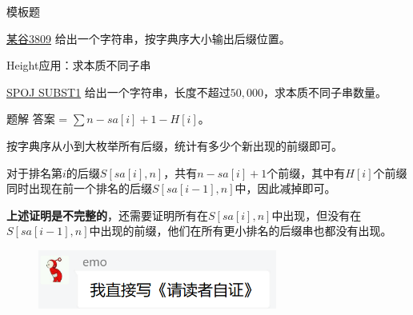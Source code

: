 \documentclass[usenames,dvipsnames]{ctexbeamer}		%
\begin{document}
\begin{frame}{模板题}
    
\begin{block}{\href{https://www.luogu.com.cn/problem/P3809}{某谷3809}}
给出一个字符串，按字典序大小输出后缀位置。
\end{block}
\end{frame}

\begin{frame}{Height应用：求本质不同子串}
    
\begin{block}{\href{https://www.spoj.com/problems/SUBST1/}{SPOJ SUBST1}}
给出一个字符串，长度不超过$50,000$，求本质不同子串数量。
\end{block}

\pause

\begin{block}{题解}
答案 = $\sum{n - sa[i] + 1 - H[i]}$。
\pause

按字典序从小到大枚举所有后缀，统计有多少个新出现的前缀即可。

对于排名第$i$的后缀$S[sa[i],n]$，共有$n - sa[i] + 1$个前缀，其中有$H[i]$个前缀同时出现在前一个排名的后缀$S[sa[i-1], n]$中，因此减掉即可。

\pause

\textbf{上述证明是不完整的}，还需要证明所有在$S[sa[i],n]$中出现，但没有在$S[sa[i-1],n]$中出现的前缀，他们在所有更小排名的后缀串也都没有出现。

\pause
\begin{figure}
    \centering
    \includegraphics[width=0.7\textwidth]{./emo.png}
\end{figure}


\end{block}
\end{frame}
\end{document}
